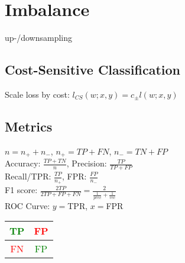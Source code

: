 \section*{Imbalance}

up-/downsampling

\subsection*{Cost-Sensitive Classification}
Scale loss by cost: $l_{CS}(w;x,y) = c_\pm l(w;x,y)$

\subsection*{Metrics}
$n = n_+ + n_-$, $n_+ = TP + FN$, $n_- = TN + FP$\\
Accuracy: $\frac{TP+TN}{n}$,
Precision: $\frac{TP}{TP+FP}$\\
Recall/TPR: $\frac{TP}{n_+}$,
FPR: $ \frac{FP}{n_-}$\\
F1 score: $\frac{2TP}{2TP+FP+FN} = \frac{2}{\frac{1}{prec} + \frac{1}{rec}}$\\
ROC Curve: $y = $TPR, $x = $FPR

\begin{tabular}{|c|c|}
    \hline
    \textcolor{green}{TP} & \textcolor{red}{FP} \\
    \hline
    \textcolor{red}{FN} & \textcolor{green}{FP} \\
    \hline
\end{tabular}